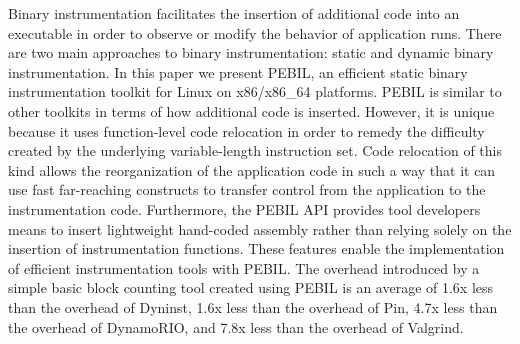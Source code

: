 \begin{it}

Binary instrumentation facilitates the insertion of additional code into an
executable in order to observe or modify the behavior of application runs. There
are two main approaches to binary instrumentation: static and dynamic binary
instrumentation. In this paper we present PEBIL, an efficient static binary
instrumentation toolkit for Linux on x86/x86\_64 platforms. PEBIL is similar to
other toolkits in terms of how additional code is inserted. However, it is
unique because it uses function-level code relocation in order to remedy the
difficulty created by the underlying variable-length instruction set. Code
relocation of this kind allows the reorganization of the application code in
such a way that it can use fast far-reaching constructs to transfer control from
the application to the instrumentation code. Furthermore, the PEBIL API provides
tool developers means to insert lightweight hand-coded assembly rather than
relying solely on the insertion of instrumentation functions. These features
enable the implementation of efficient instrumentation tools with PEBIL. The
overhead introduced by a simple basic block counting tool created using PEBIL is
an average of 1.6x less than the overhead of Dyninst, 1.6x less than the overhead 
of Pin, 4.7x less than the overhead of DynamoRIO, and 7.8x less than the 
overhead of Valgrind.

\end{it}